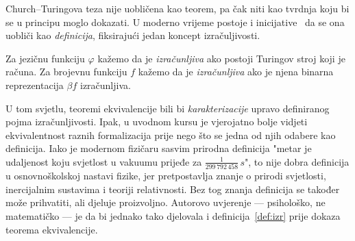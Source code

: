 Church--\!Turingova teza nije uobličena kao teorem, pa čak niti kao tvrdnja koju bi se u principu moglo dokazati. U moderno vrijeme postoje i inicijative~\cite{soare} da se ona uobliči kao \emph{definicija}, fiksirajući jedan koncept izračuljivosti.

\begin{definicija}\label{def:izr}
Za jezičnu funkciju $\varphi$ kažemo da je \emph{izračunljiva} ako postoji Turingov stroj koji je računa.
Za brojevnu funkciju $f$ kažemo da je \emph{izračunljiva} ako je njena binarna reprezentacija $\beta f$ izračunljiva.
\end{definicija}

U tom svjetlu, teoremi ekvivalencije bili bi \emph{karakterizacije} upravo definiranog pojma izračunljivosti. Ipak, u uvodnom kursu je vjerojatno bolje vidjeti ekvivalentnost raznih formalizacija prije nego što se jedna od njih odabere kao definicija. Iako je modernom fizičaru sasvim prirodna definicija "metar je udaljenost koju svjetlost u vakuumu prijeđe za $\frac{1}{299\,792\,458}\,s$", to nije dobra definicija u osnovnoškolskoj nastavi fizike, jer pretpostavlja znanje o prirodi svjetlosti, inercijalnim sustavima i teoriji relativnosti. Bez tog znanja definicija se također može prihvatiti, ali djeluje proizvoljno. Autorovo uvjerenje --- psihološko, ne matematičko --- je da bi jednako tako djelovala i definicija~\ref{def:izr} prije dokaza teorema ekvivalencije.


